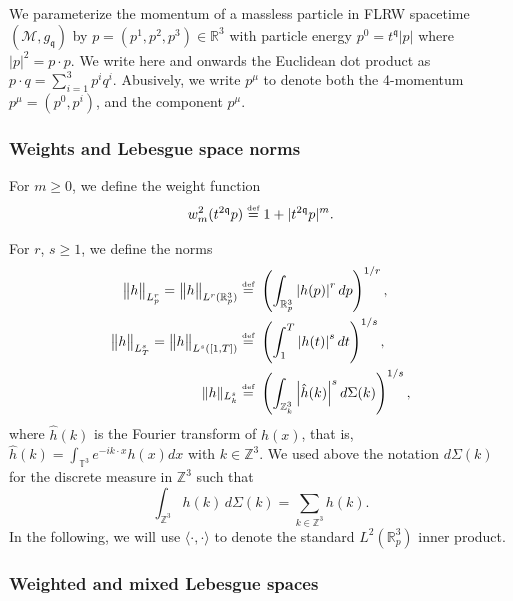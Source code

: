 \documentclass[reqno]{amsart}
\newcommand{\eqdef }{\overset{\mbox{\tiny{def}}}{=}}
\newcommand{\pv}{p}
\newcommand{\pZzero}{\pv^{0}}
\def\norm#1{\big\Vert#1\big\Vert}
\def\R{\mathbb R}
\newcommand{\threed}{{\mathbb R}^3}
\newcommand{\qq}{\mathfrak{q}}
\newcommand{\tq}{t^{\qq}}
\newcommand{\tqq}{t^{2\qq}}
\newcommand{\Z}{\mathbb{Z}}
\theoremstyle{definition}
\numberwithin{equation}{section}
\numberwithin{theorem}{section}
\begin{document}
We parameterize the momentum of a massless particle in FLRW spacetime \((\mathcal{M},g_{\qq})\) by \(p=(p^1,p^2,p^3)\in \R^3\) with particle energy $\pZzero = \tq |\pv|$ where \(|p|^2= p \cdot p\). We write here and onwards the Euclidean dot product as \(p \cdot q=\sum_{i=1}^3p^iq^i\). Abusively, we write \(p^{\mu}\) to denote both the 4-momentum \(p^{\mu}=(p^0, p^i)\), and the component \(p^{\mu}\).



\subsubsection{Weights and Lebesgue space norms}

For $m\ge 0$, we define the weight function
\begin{align} \label{weight.fcn.def}
     w_{m}^2(\tqq \pv) \eqdef 1+|\tqq \pv|^m.
\end{align}


For \(r\), \(s\geq 1\), we define the norms 
\begin{align*}
    \norm{h}_{L^r_{\pv}}
=\norm{h}_{L^r(\threed_{\pv})}
\eqdef &~
\left(
\int_{\R^3_p}
\left| h(\pv)\right|^r
d\pv
\right)^{1/r},
\\
    \norm{h}_{L^s_{T}}
=\norm{h}_{L^s([1,T])}
\eqdef &~
\left(
\int_{1}^T
\left| h(t)\right|^s
dt
\right)^{1/s},
\\
\|h\|_{L^s_k}
\eqdef &~
\left( \int_{\Z^3_{k}}
\left| \hat{h}(k)\right|^s
d\Sigma(k)
\right)^{1/s},
\end{align*}
where \(\hat{h}(k)\) is the Fourier transform of \(h(x)\), that is, \(\hat{h}(k)=\int_{\mathbb{T}^3} e^{-ik\cdot x}h(x)dx\) with \(k\in \Z^3\). We used above the notation $d\Sigma(k)$ for the discrete measure in $\Z^3$ such that
$$\int_{\Z^3}h(k)\,d\Sigma(k)=\sum_{k\in \Z^3}h(k).$$ In the following, we will use \(\langle \cdot ,\cdot \rangle\) to denote the standard \(L^2(\mathbb{R}^3_p)\) inner product.

\subsubsection{Weighted and mixed Lebesgue spaces}
\end{document}
